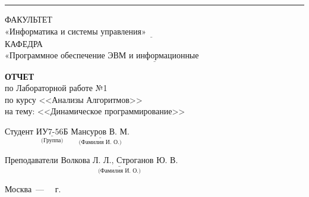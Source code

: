 \begin{titlepage}
	\noindent\rule{18cm}{3pt}
	\newline\newline
	\noindent ФАКУЛЬТЕТ $\underline{\text{«Информатика и системы управления»~~~~~~~~~~~~~~~~~~~~~~~~~~~~~~~~~~~~~~~~~~~~~~~~~~~~~~~}}$ \newline\newline
	\noindent КАФЕДРА $\underline{\text{«Программное обеспечение ЭВМ и информационные технологии»~~~~~~~~~~~~~~~~~~~~~~~}}$\newline\newline\newline\newline\newline\newline\newline
	
	
	\begin{center}
		\textbf{ОТЧЕТ} \\
		по Лабораторной работе №1\\
		по курсу <<Анализы Алгоритмов>> \\
		на тему: <<Динамическое программирование>>
	\end{center}

	\vfill
	\vfill
	\vfill
	Студент $\underset{\text{(Группа)}}{\underline{\text{ИУ7-56Б}}}$
	\hfill
	$\underset{\text{(Фамилия~И.~О.)}}{\underline{\text{Мансуров~В.~М.}}}$
	
	Преподаватели 
	\hfill
	$\underset{\text{(Фамилия~И.~О.)}}{\underline{\text{Волкова~Л.~Л., Строганов~Ю.~В.}}}$
	
	\begin{center}
		\vfill
		Москва~---~\the\year
		~г.
	\end{center}
	\restoregeometry
\end{titlepage}

